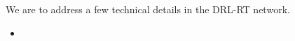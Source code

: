 \documentclass{svproc}
\newcommand{\tl}[1]{\textcolor{blue} {TL: #1 :TL} }
\begin{document}
We are to address a few technical details in the DRL-RT network. 
\begin{itemize}
	\item 
	
\end{itemize}
%
%
\end{document}

